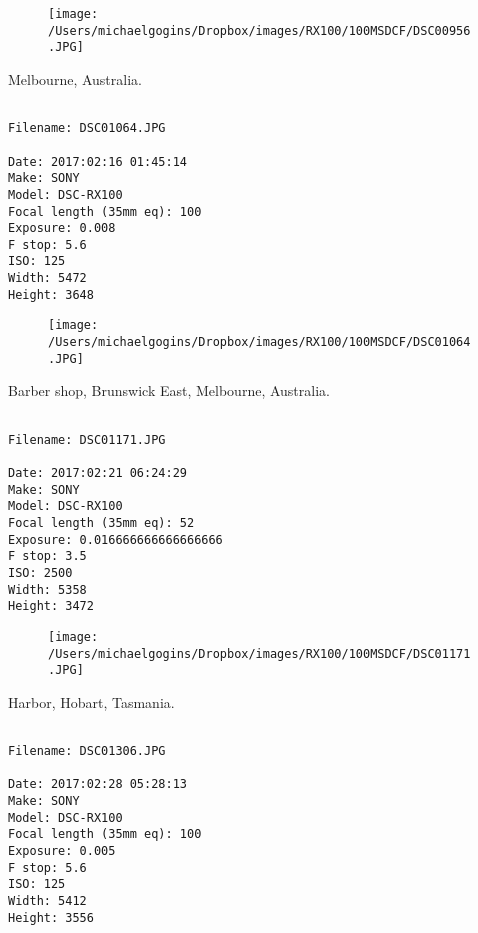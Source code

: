 \documentclass[11pt,letter,DIV=14,paper=landscape]{scrbook}
\begin{document}
\begin{figure}
\texttt{[image: /Users/michaelgogins/Dropbox/images/RX100/100MSDCF/DSC00956.JPG]}
\end{figure}
    
\clearpage
\noindent Melbourne, Australia.
\noindent
\begin{lstlisting}

Filename: DSC01064.JPG

Date: 2017:02:16 01:45:14
Make: SONY
Model: DSC-RX100
Focal length (35mm eq): 100
Exposure: 0.008
F stop: 5.6
ISO: 125
Width: 5472
Height: 3648
\end{lstlisting}
\clearpage

\begin{figure}
\texttt{[image: /Users/michaelgogins/Dropbox/images/RX100/100MSDCF/DSC01064.JPG]}
\end{figure}
    
\clearpage
\noindent Barber shop, Brunswick East, Melbourne, Australia.
\noindent
\begin{lstlisting}

Filename: DSC01171.JPG

Date: 2017:02:21 06:24:29
Make: SONY
Model: DSC-RX100
Focal length (35mm eq): 52
Exposure: 0.016666666666666666
F stop: 3.5
ISO: 2500
Width: 5358
Height: 3472
\end{lstlisting}
\clearpage

\begin{figure}
\texttt{[image: /Users/michaelgogins/Dropbox/images/RX100/100MSDCF/DSC01171.JPG]}
\end{figure}
    
\clearpage
\noindent Harbor, Hobart, Tasmania.
\noindent
\begin{lstlisting}

Filename: DSC01306.JPG

Date: 2017:02:28 05:28:13
Make: SONY
Model: DSC-RX100
Focal length (35mm eq): 100
Exposure: 0.005
F stop: 5.6
ISO: 125
Width: 5412
Height: 3556
\end{lstlisting}
\clearpage
\end{document}
